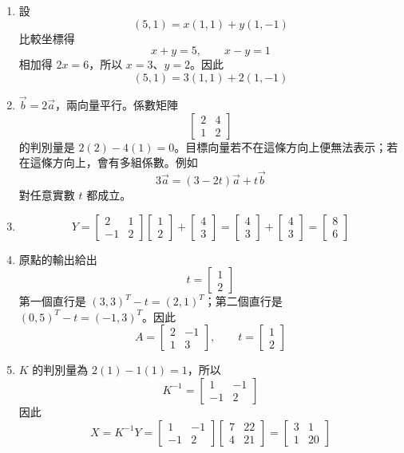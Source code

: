 \documentclass[11pt,a4paper]{article}
\begin{document}
\begin{enumerate}
\def\labelenumi{\arabic{enumi}.}
\item
  設
  \[(5,1)=x(1,1)+y(1,-1)\]
  比較坐標得
  \[x+y=5,\qquad x-y=1\]
  相加得 \(2x=6\)，所以 \(x=3\)、\(y=2\)。因此
  \[(5,1)=3(1,1)+2(1,-1)\]
\item
  \(\vec b=2\vec a\)，兩向量平行。係數矩陣
  \[\begin{bmatrix}2&4\\1&2\end{bmatrix}\]
  的判別量是 \(2(2)-4(1)=0\)。目標向量若不在這條方向上便無法表示；若在這條方向上，會有多組係數。例如
  \[3\vec a=(3-2t)\vec a+t\vec b\]
  對任意實數 \(t\) 都成立。
\item
  \[
   Y=\begin{bmatrix}2&1\\-1&2\end{bmatrix}
   \begin{bmatrix}1\\2\end{bmatrix}
   +\begin{bmatrix}4\\3\end{bmatrix}
   =\begin{bmatrix}4\\3\end{bmatrix}
   +\begin{bmatrix}4\\3\end{bmatrix}
   =\begin{bmatrix}8\\6\end{bmatrix}
   \]
\item
  原點的輸出給出
  \[t=\begin{bmatrix}1\\2\end{bmatrix}\]
  第一個直行是 \((3,3)^T-t=(2,1)^T\)；第二個直行是 \((0,5)^T-t=(-1,3)^T\)。因此
  \[A=\begin{bmatrix}2&-1\\1&3\end{bmatrix},\qquad t=\begin{bmatrix}1\\2\end{bmatrix}\]
\item
  \(K\) 的判別量為 \(2(1)-1(1)=1\)，所以
  \[K^{-1}=\begin{bmatrix}1&-1\\-1&2\end{bmatrix}\]
  因此
  \[
  X=K^{-1}Y
  =\begin{bmatrix}1&-1\\-1&2\end{bmatrix}
  \begin{bmatrix}7&22\\4&21\end{bmatrix}
  =\begin{bmatrix}3&1\\1&20\end{bmatrix}
  \]
\end{enumerate}
\end{document}

